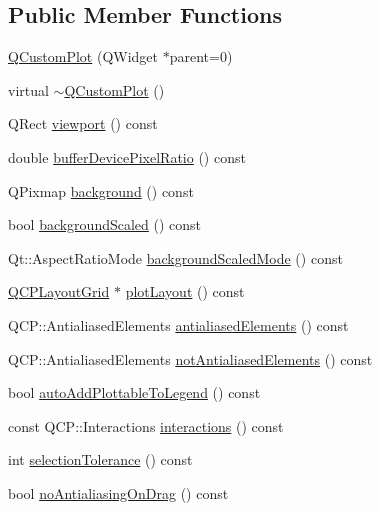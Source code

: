 \subsection*{Public Member Functions}
\begin{DoxyCompactItemize}
\item 
\mbox{\hyperlink{class_q_custom_plot_a45b99626558651a6428b83972b0b34b8}{Q\+Custom\+Plot}} (Q\+Widget $\ast$parent=0)
\item 
virtual \mbox{\hyperlink{class_q_custom_plot_a75d9b6f599dcae706e45efd425c5499e}{$\sim$\+Q\+Custom\+Plot}} ()
\item 
Q\+Rect \mbox{\hyperlink{class_q_custom_plot_a19842409b18f556b256d05e97fffc670}{viewport}} () const
\item 
double \mbox{\hyperlink{class_q_custom_plot_a53d35abe0f576f9838cde5d0bee47657}{buffer\+Device\+Pixel\+Ratio}} () const
\item 
Q\+Pixmap \mbox{\hyperlink{class_q_custom_plot_a5b9bbc838cb856e31b39c050fad49f9a}{background}} () const
\item 
bool \mbox{\hyperlink{class_q_custom_plot_aac96f3a0f5070228ed13602976886b80}{background\+Scaled}} () const
\item 
Qt\+::\+Aspect\+Ratio\+Mode \mbox{\hyperlink{class_q_custom_plot_af8f1ebfdbf48d7c49f95136475d55b14}{background\+Scaled\+Mode}} () const
\item 
\mbox{\hyperlink{class_q_c_p_layout_grid}{Q\+C\+P\+Layout\+Grid}} $\ast$ \mbox{\hyperlink{class_q_custom_plot_af1a1f1f571237deb7c2bd34a5e9f018f}{plot\+Layout}} () const
\item 
Q\+C\+P\+::\+Antialiased\+Elements \mbox{\hyperlink{class_q_custom_plot_a631762eb183aceecee73d30e108641ee}{antialiased\+Elements}} () const
\item 
Q\+C\+P\+::\+Antialiased\+Elements \mbox{\hyperlink{class_q_custom_plot_a75571bc5b2167e83def132fc993091b3}{not\+Antialiased\+Elements}} () const
\item 
bool \mbox{\hyperlink{class_q_custom_plot_ac4b87de13eaceadc8db5a66654197689}{auto\+Add\+Plottable\+To\+Legend}} () const
\item 
const Q\+C\+P\+::\+Interactions \mbox{\hyperlink{class_q_custom_plot_a2c78c5fd2943c148ab76652801d3f2dc}{interactions}} () const
\item 
int \mbox{\hyperlink{class_q_custom_plot_a5441d11013afeaf4b8f2ea06e8624a25}{selection\+Tolerance}} () const
\item 
bool \mbox{\hyperlink{class_q_custom_plot_aca3f01f903fb250a3dd27104d92830be}{no\+Antialiasing\+On\+Drag}} () const

\end{DoxyCompactItemize}
